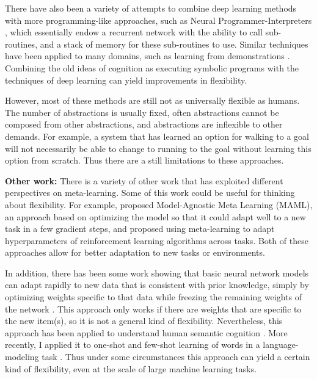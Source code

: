 \documentclass[11pt]{article}
\begin{document}
There have also been a variety of attempts to combine deep learning methods with more programming-like approaches, such as Neural Programmer-Interpreters \citep{Reed2015}, which essentially endow a recurrent network with the ability to call sub-routines, and a stack of memory for these sub-routines to use. Similar techniques have been applied to many domains, such as learning from demonstrations \citep[e.g.]{Xu2017a}. Combining the old ideas of cognition as executing symbolic programs \citep{Newell1961} with the techniques of deep learning can yield improvements in flexibility. \par  
However, most of these methods are still not as universally flexible as humans. The number of abstractions is usually fixed, often abstractions cannot be composed from other abstractions, and abstractions are inflexible to other demands. For example, a system that has learned an option for walking to a goal will not necessarily be able to change to running to the goal without learning this option from scratch. Thus there are a still limitations to these approaches. \par 
\textbf{Other work:} There is a variety of other work that has exploited different perspectives on meta-learning. Some of this work could be useful for thinking about flexibility. For example, \citet{Finn2017a} proposed Model-Agnostic Meta Learning (MAML), an approach based on optimizing the model so that it could adapt well to a new task in a few gradient steps, and \citet{Xu2018} proposed using meta-learning to adapt hyperparameters of reinforcement learning algorithms across tasks. Both of these approaches allow for better adaptation to new tasks or environments. \par
In addition, there has been some work showing that basic neural network models can adapt rapidly to new data that is consistent with prior knowledge, simply by optimizing weights specific to that data while freezing the remaining weights of the network \citep{Rumelhart1993}. This approach only works if there are weights that are specific to the new item(s), so it is not a general kind of flexibility. Nevertheless, this approach has been applied to understand human semantic cognition \citep{Rogers2004}. More recently, I applied it to one-shot and few-shot learning of words in a language-modeling task \citep{Lampinen2018a}. Thus under some circumstances this approach can yield a certain kind of flexibility, even at the scale of large machine learning tasks. \par 
\end{document}
